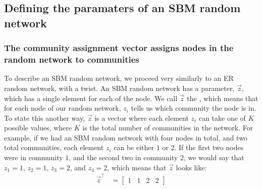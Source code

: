 \documentclass[letterpaper,10pt,english]{jupyterBook}
\begin{document}
\noindent{}


\subsection{Defining the paramaters of an SBM random network}
\label{\detokenize{representations/ch5/single-network-models_SBM:defining-the-paramaters-of-an-sbm-random-network}}

\subsubsection{The community assignment vector assigns nodes in the random network to communities}
\label{\detokenize{representations/ch5/single-network-models_SBM:the-community-assignment-vector-assigns-nodes-in-the-random-network-to-communities}}
\sphinxAtStartPar
To describe an SBM random network, we proceed very similarly to an ER random network, with a twist. An SBM random network has a parameter, \(\vec z\), which has a single element for each of the node. We call \(\vec z\) the , which means that for each node of our random network, \(z_i\) tells us which community the node is in. To state this another way, \(\vec z\) is a vector where each element \(z_i\) can take one of \(K\) possible values, where \(K\) is the total number of communities in the network. For example, if we had an SBM random network with four nodes in total, and two total communities, each element \(z_i\) can be either \(1\) or \(2\). If the first two nodes were in community \(1\), and the second two in community \(2\), we would say that \(z_1 = 1\), \(z_2 = 1\), \(z_3 = 2\), and \(z_4 = 2\), which means that \(\vec z\) looks like:
\begin{align*}
    \vec z^\top &= \begin{bmatrix}1 & 1 & 2 & 2\end{bmatrix}
\end{align*}
\end{document}
